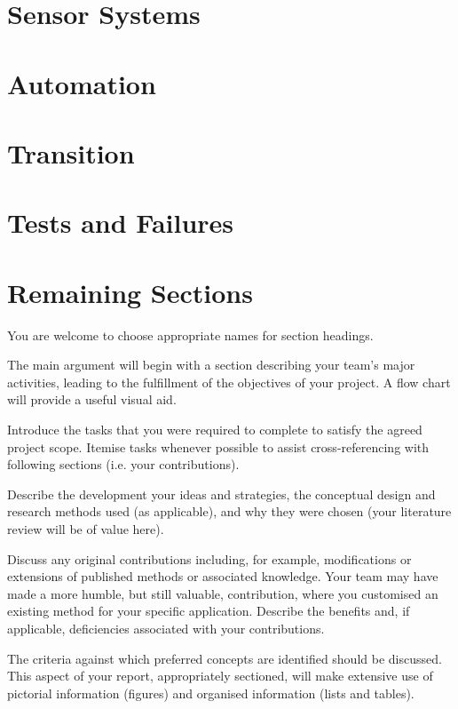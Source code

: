 \documentclass[]{article}
\begin{document}
\section{Sensor Systems}


\section{Automation}


\section{Transition}


\section{Tests and Failures}


\section{Remaining Sections}
\color{red}
You are welcome to choose appropriate names for section headings.

The main argument will begin with a section describing your team's major activities, leading to the fulfillment of the objectives of your project.  A flow chart will provide a useful visual aid.

Introduce the tasks that you were required to complete to satisfy the agreed project scope. Itemise tasks whenever possible to assist cross-referencing with following sections (i.e. your contributions).

Describe the development your ideas and strategies, the conceptual design and research methods used (as applicable), and why they were chosen (your literature review will be of value here).  

Discuss any original contributions including, for example, modifications or extensions of published methods or associated knowledge.  Your team may have made a more humble, but still valuable, contribution, where you customised an existing method for your specific application.  Describe the benefits and, if applicable, deficiencies associated with your contributions.

The criteria against which preferred concepts are identified should be discussed.  This aspect of your report, appropriately sectioned, will make extensive use of pictorial information (figures) and organised information (lists and tables).  
\end{document}
